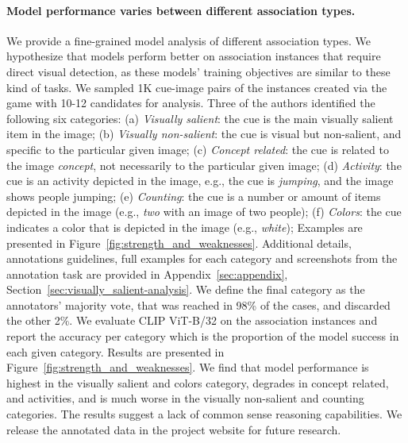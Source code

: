 \documentclass{article}
\begin{document}
 \paragraph{Model performance varies between different association types.} We provide a fine-grained model analysis of different association types. We hypothesize that models perform better on association instances that require direct visual detection, as these models' training objectives are similar to these kind of tasks. We sampled 1K cue-image pairs of the instances created via the game with 10-12 candidates for analysis. Three of the authors identified the following six categories: (a) \emph{Visually salient}: the cue is the main visually salient item in the image; (b) \emph{Visually non-salient}: the cue is visual but non-salient, and specific to the particular given image; (c) \emph{Concept related}: the cue is related to the image \emph{concept}, not necessarily to the particular given image; (d) \emph{Activity}: the cue is an activity depicted in the image, e.g., the cue is \emph{jumping}, and the image shows people jumping; (e)  \emph{Counting}: the cue is a number or amount of items depicted in the image (e.g., \emph{two} with an image of two people); (f) \emph{Colors}:  the cue indicates a color that is depicted in the image (e.g., \emph{white}); Examples are presented in Figure~\ref{fig:strength_and_weaknesses}. Additional details, annotations guidelines, full examples for each category and screenshots from the annotation task are provided in Appendix~\ref{sec:appendix}, Section~\ref{sec:visually_salient-analysis}. We define the final category as the annotators' majority vote, that was reached in 98\% of the cases, and discarded the other 2\%. 
We evaluate CLIP ViT-B/32 on the association instances and report the accuracy per category which is the proportion of the model success in each given category. Results are presented in Figure~\ref{fig:strength_and_weaknesses}. We find that model performance is highest in the visually salient and colors category, degrades in concept related, and activities, and is much worse in the visually non-salient and counting categories. The results suggest a lack of common sense reasoning capabilities. We release the annotated data in the project website for future research. 
\end{document}
